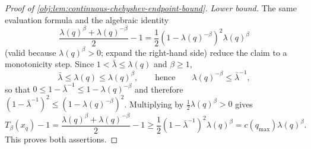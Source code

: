 \begin{proof}[Proof of \cref{obj:lem:continuous-chebyshev-endpoint-bound}]
\emph{Lower bound.}
The same evaluation formula and the algebraic identity
\[
\frac{\lambda(q)^\beta+\lambda(q)^{-\beta}}2-1
=
\frac12\left(1-\lambda(q)^{-\beta}\right)^2\lambda(q)^\beta
\]
(valid because \(\lambda(q)^\beta>0\); expand the right-hand side) reduce the claim to a monotonicity step. Since \(1<\bar{\lambda}\le\lambda(q)\) and \(\beta\ge1\),
\[
\bar{\lambda}\le\lambda(q)\le\lambda(q)^\beta ,
\qquad\text{hence}\qquad
\lambda(q)^{-\beta}\le\bar{\lambda}^{-1},
\]
so that \(0\le 1-\bar{\lambda}^{-1}\le 1-\lambda(q)^{-\beta}\) and therefore \((1-\bar{\lambda}^{-1})^2\le\left(1-\lambda(q)^{-\beta}\right)^2\). Multiplying by \(\tfrac12\lambda(q)^\beta>0\) gives
\[
T_\beta(x_q)-1
=
\frac{\lambda(q)^\beta+\lambda(q)^{-\beta}}2-1
\ge
\frac12(1-\bar{\lambda}^{-1})^2\lambda(q)^\beta
=
c(q_{\max})\lambda(q)^\beta.
\] %
This proves both assertions. %
\end{proof}
